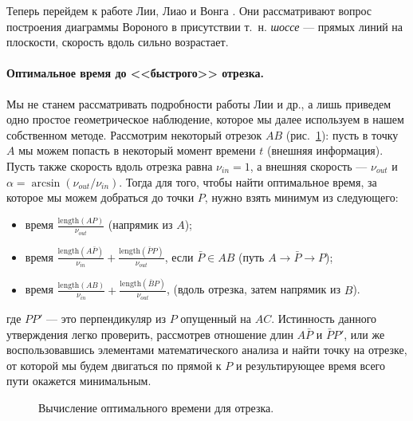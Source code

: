 \documentclass[12pt]{article}
\begin{document}
Теперь перейдем к работе Лии, Лиао и Вонга \cite{distmap}. Они рассматривают
вопрос построения диаграммы Вороного в присутствии т.~н. \emph{шоссе} ---
прямых линий на плоскости, скорость вдоль сильно возрастает.

\paragraph{Оптимальное время до <<быстрого>> отрезка.}\label{segopt}
Мы не станем рассматривать подробности работы Лии и др., а лишь приведем 
одно простое геометрическое наблюдение, которое мы далее используем в нашем 
собственном методе. Рассмотрим некоторый отрезок
$AB$ (рис.~\ref{fig_segopt}): пусть в точку $A$ мы можем попасть в некоторый
момент времени $t$ (внешняя информация). Пусть также скорость вдоль отрезка 
равна $\nu_{in} = 1$, а внешняя скорость --- $\nu_{out}$ и
$\alpha = \arcsin(\nu_{out} / \nu_{in})$. Тогда для того, чтобы найти 
оптимальное время, за которое мы можем добраться до точки $P$, нужно
взять минимум из следующего:
\begin{itemize}
\item время $\frac{\mathrm{length}(AP)}{\nu_{out}}$ (напрямик из $A$);
\item время $\frac{\mathrm{length}(A\bar{P})}{\nu_{in}} + \frac{\mathrm{length}(\bar{P}P)}{\nu_{out}}$, 
если $\bar{P} \in AB$ (путь $A \to \bar{P} \to P$);
\item время $\frac{\mathrm{length}(AB)}{\nu_{in}} + \frac{\mathrm{length}(\bar{B}P)}{\nu_{out}}$,
(вдоль отрезка, затем напрямик из $B$).
\end{itemize}
где $PP'$ --- это перпендикуляр из $P$ опущенный на $AC$. 
Истинность данного утверждения легко проверить, рассмотрев
отношение длин $A\bar{P}$ и $\bar{P}P'$, или же воспользовавшись
элементами математического анализа и найти точку на отрезке,
от которой мы будем двигаться по прямой к $P$ и результирующее время 
всего пути окажется минимальным.
\begin{figure}
\begin{center}
\end{center}
\caption{Вычисление оптимального времени для отрезка.}
\label{fig_segopt}
\end{figure}
\end{document}
